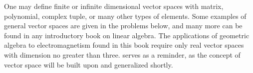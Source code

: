 One may define finite or infinite dimensional vector spaces with matrix, polynomial, complex tuple, or many other types of elements.
Some examples of general vector spaces are given in the problems below, and many more can be found in any introductory book on linear algebra.
The applications of geometric algebra to electromagnetism found in this book require only real vector spaces with dimension no greater than three.
 serves as a reminder, as the concept of vector space will be built upon and generalized shortly.
